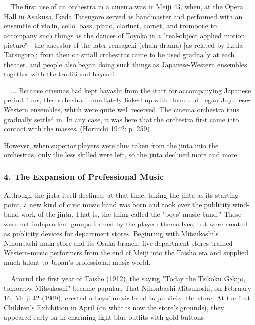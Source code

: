 \begin{gquote}
　The first use of an orchestra in a cinema was in Meiji 43, when, at the Opera Hall in Asakusa, Ikeda Tatsugorō served as bandmaster and performed with an ensemble of violin, cello, bass, piano, clarinet, cornet, and trombone to accompany such things as the dances of Toyoka in a "real-object applied motion picture"—the ancestor of the later rensageki (chain drama) [as related by Ikeda Tatsugorō]; from then on small orchestras came to be used gradually at each theater, and people also began doing such things as Japanese-Western ensembles together with the traditional hayashi.\par{}　... Because cinemas had kept hayashi from the start for accompanying Japanese period films, the orchestra immediately linked up with them and began Japanese-Western ensembles, which were quite well received. The cinema orchestra thus gradually settled in. In any case, it was here that the orchestra first came into contact with the masses. (Horiuchi 1942: p. 259)
\end{gquote}

However, when superior players were thus taken from the jinta into the orchestras, only the less skilled were left, so the jinta declined more and more.

\subsubsection{4. The Expansion of Professional Music}

Although the jinta itself declined, at that time, taking the jinta as its starting point, a new kind of civic music band was born and took over the publicity wind-band work of the jinta. That is, the thing called the "boys' music band." These were not independent groups formed by the players themselves, but were created as publicity devices for department stores. Beginning with Mitsukoshi's Nihonbashi main store and its Osaka branch, five department stores trained Western-music performers from the end of Meiji into the Taishō era and supplied much talent to Japan's professional music world.

\begin{gquote}
　Around the first year of Taishō (1912), the saying "Today the Teikoku Gekijō, tomorrow Mitsukoshi" became popular. That Nihonbashi Mitsukoshi, on February 16, Meiji 42 (1909), created a boys' music band to publicize the store. At the first Children's Exhibition in April (on what is now the store's grounds), they appeared early on in charming light-blue outfits with gold buttons
\end{gquote}


